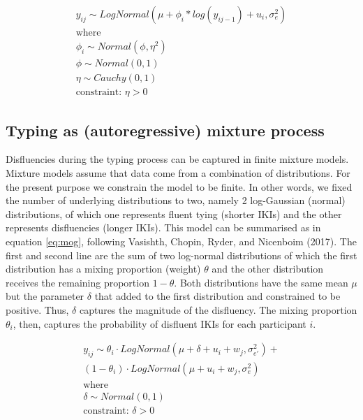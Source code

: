 \documentclass[english,man,floatsintext]{apa7}
\begin{document}
\[
\tag{6}
\begin{aligned}
y_{ij} \sim LogNormal(\mu + \phi_i*log(y_{ij-1}) + u_i, \sigma_e^2)\\
\text{where}\\
\phi_i \sim Normal(\phi, \eta^2)\\
\phi \sim Normal(0, 1)\\
\eta \sim Cauchy(0, 1)\\
\text{constraint: }\eta >0 
\end{aligned}
\label{eq:ark}
\]

\hypertarget{typing-as-autoregressive-mixture-process}{%
\subsection{Typing as (autoregressive) mixture process}\label{typing-as-autoregressive-mixture-process}}

Disfluencies during the typing process can be captured in finite mixture models. Mixture models assume that data come from a combination of distributions. For the present purpose we constrain the model to be finite. In other words, we fixed the number of underlying distributions to two, namely 2 log-Gaussian (normal) distributions, of which one represents fluent tying (shorter IKIs) and the other represents disfluencies (longer IKIs). This model can be summarised as in equation \ref{eq:mog}, following Vasishth, Chopin, Ryder, and Nicenboim (2017). The first and second line are the sum of two log-normal distributions of which the first distribution has a mixing proportion (weight) \(\theta\) and the other distribution receives the remaining proportion \(1-\theta\). Both distributions have the same mean \(\mu\) but the parameter \(\delta\) that added to the first distribution and constrained to be positive. Thus, \(\delta\) captures the magnitude of the disfluency. The mixing proportion \(\theta_i\), then, captures the probability of disfluent IKIs for each participant \(i\).

\[
\tag{7}
\begin{aligned}
    y_{ij} \sim \theta_i \cdot LogNormal(\mu + \delta + u_i + w_j, \sigma_{e'}^2) +\\
        (1 - \theta_i) \cdot LogNormal(\mu + u_i + w_j, \sigma_{e}^2)\\
        \text{where}\\
        \delta \sim Normal(0,1)\\
        \text{constraint: } \delta > 0
\end{aligned}   
\label{eq:mog}
\]
\end{document}
